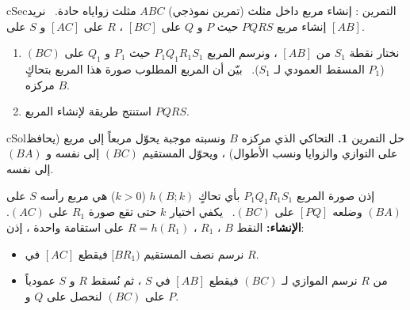 \documentclass[12pt,a4paper]{article}
\newenvironment{BOX}[2]{\begin{otherlanguage}{english}\begin{arbox}{#1}{#2}}{\end{arbox}\end{otherlanguage}}
\newcounter{exo}
\newenvironment{tamrin}[1]{\stepcounter{exo}\begin{BOX}{cSec}{التمرين \theexo: #1}}{\end{BOX}}
\newenvironment{hal}{\Needspace{12\baselineskip}\begin{otherlanguage}{english}\begin{arbox}[breakable]{cSol}{حل التمرين \theexo}}{\end{arbox}\end{otherlanguage}}
\newenvironment{LTR}{\begin{otherlanguage}{english}}{\end{otherlanguage}}
\begin{document}
\begin{tamrin}{إنشاء مربع داخل مثلث (تمرين نموذجي)}
$ABC$ مثلث زواياه حادة. \ نريد إنشاء مربع $PQRS$ حيث $P$ و $Q$ على $[BC]$ ، $R$ على $[AC]$ و $S$ على $[AB]$.
\begin{enumerate}
\item نختار نقطة $S_1$ من $[AB]$ ، ونرسم المربع $P_1Q_1R_1S_1$ حيث $P_1$ و $Q_1$ على $(BC)$ ($P_1$ المسقط العمودي لـ $S_1$). \ بيّن أن المربع المطلوب صورة هذا المربع بتحاكٍ مركزه $B$.
\item استنتج طريقة لإنشاء المربع $PQRS$.
\end{enumerate}
\end{tamrin}
\begin{hal}
\textbf{1.} التحاكي الذي مركزه $B$ ونسبته موجبة يحوّل مربعاً إلى مربع (يحافظ على التوازي والزوايا ونسب الأطوال) ، ويحوّل المستقيم $(BC)$ إلى نفسه و $(BA)$ إلى نفسه.\par
إذن صورة المربع $P_1Q_1R_1S_1$ بأي تحاكٍ $h(B;k)$ ($k>0$) هي مربع رأسه $S$ على $(BA)$ وضلعه $[PQ]$ على $(BC)$. \ يكفي اختيار $k$ حتى تقع صورة $R_1$ على $(AC)$.
 \textbf{الإنشاء:} النقط $B$ ، $R_1$ ، $R=h(R_1)$ على استقامة واحدة ، إذن:
\begin{itemize}
\item نرسم نصف المستقيم $[BR_1)$ فيقطع $[AC]$ في $R$.
\item من $R$ نرسم الموازي لـ $(BC)$ فيقطع $[AB]$ في $S$ ، ثم نُسقط $R$ و $S$ عمودياً على $(BC)$ لنحصل على $Q$ و $P$.
\end{itemize}
\begin{center}\begin{LTR}
\end{LTR}\end{center}
\end{hal}
\end{document}
